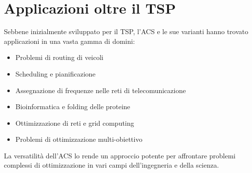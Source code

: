 \section{Applicazioni oltre il \Gls{TSP}}

Sebbene inizialmente sviluppato per il \Gls{TSP}, l'\Gls{ACS} e le sue varianti hanno trovato applicazioni in una vasta gamma di domini:

\begin{itemize}
	\item Problemi di routing di veicoli
	\item Scheduling e pianificazione
	\item Assegnazione di frequenze nelle reti di telecomunicazione
	\item Bioinformatica e folding delle proteine
	\item Ottimizzazione di reti e grid computing
	\item Problemi di ottimizzazione multi-obiettivo
\end{itemize}

La versatilità dell'\Gls{ACS} lo rende un approccio potente per affrontare problemi complessi di ottimizzazione in vari campi dell'ingegneria e della scienza.
